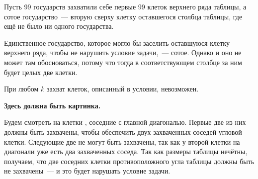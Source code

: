 \begin{itemize}


\itB Пусть 99 государств захватили себе первые 99 клеток верхнего ряда таблицы, а сотое государство~— вторую сверху клетку оставшегося столбца таблицы, где ещё не было ни одного государства.

Единственное государство, которое могло бы заселить оставшуюся клетку верхнего ряда, чтобы не нарушить условие задачи,~— сотое. Однако и оно не может там обосноваться, потому что тогда в соответствующем столбце за ним будет целых две клетки.

\itC При любом $k$ захват клеток, описанный в условии, невозможен.

{\bfseries Здесь должна быть картинка.}

Будем смотреть на клетки , соседние с главной диагональю. Первые две из них должны быть захвачены, чтобы обеспечить двух захваченных соседей угловой клетки. Следующие две не могут быть захвачены, так как у второй клетки на диагонали уже есть два захваченных соседа. Так как размеры таблицы нечётны, получаем, что две соседних клетки противоположного угла таблицы должны быть не захвачены~— и это будет нарушать условие задачи.
\end{itemize}